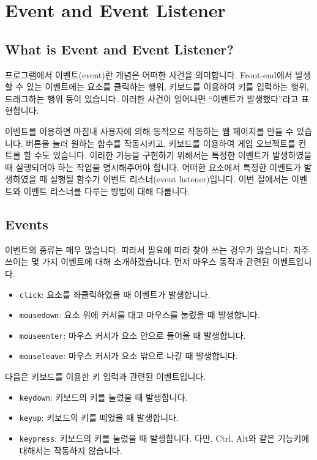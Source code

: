 \section{Event and Event Listener}\label{sect:event-and-event-listener}

\subsection*{What is Event and Event Listener?}

프로그램에서 이벤트(event)란 개념은 어떠한 사건을 의미합니다. Front-end에서 발생할 수 있는 이벤트에는 요소를 클릭하는 행위, 키보드를 이용하여 키를 입력하는 행위, 드래그하는 행위 등이 있습니다. 이러한 사건이 일어나면 ``이벤트가 발생했다''라고 표현합니다.

이벤트를 이용하면 마침내 사용자에 의해 동적으로 작동하는 웹 페이지를 만들 수 있습니다. 버튼을 눌러 원하는 함수를 작동시키고, 키보드를 이용하여 게임 오브젝트를 컨트롤 할 수도 있습니다. 이러한 기능을 구현하기 위해서는 특정한 이벤트가 발생하였을 때 실행되어야 하는 작업을 명시해주어야 합니다. 어떠한 요소에서 특정한 이벤트가 발생하였을 때 실행될 함수가 이벤트 리스너(event listener)입니다. 이번 절에서는 이벤트와 이벤트 리스너를 다루는 방법에 대해 다룹니다.

\subsection*{Events}

이벤트의 종류는 매우 많습니다. 따라서 필요에 따라 찾아 쓰는 경우가 많습니다. 자주 쓰이는 몇 가지 이벤트에 대해 소개하겠습니다. 먼저 마우스 동작과 관련된 이벤트입니다.

\begin{itemize}
    \item \texttt{click}: 요소를 좌클릭하였을 때 이벤트가 발생합니다.
    \item \texttt{mousedown}: 요소 위에 커서를 대고 마우스를 눌렀을 때 발생합니다.
    \item \texttt{mouseenter}: 마우스 커서가 요소 안으로 들어올 때 발생합니다.
    \item \texttt{mouseleave}: 마우스 커서가 요소 밖으로 나갈 때 발생합니다.
\end{itemize}

다음은 키보드를 이용한 키 입력과 관련된 이벤트입니다.

\begin{itemize}
    \item \texttt{keydown}: 키보드의 키를 눌렀을 때 발생합니다.
    \item \texttt{keyup}: 키보드의 키를 떼었을 때 발생합니다.
    \item \texttt{keypress}: 키보드의 키를 눌렀을 때 발생합니다. 다만, Ctrl, Alt와 같은 기능키에 대해서는 작동하지 않습니다.
\end{itemize}

